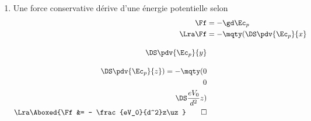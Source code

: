 \documentclass[a4paper, 12pt, final, garamond]{book}
\begin{document}
\begin{enumerate}
\begin{align*}
            \dv{\Ec_m}{t} &= 0
            \\\Lra
            \dv{t}(\Ec_c + \Ec_p) &= 0
            \\\Lra
            \dv{t}(\frac{1}{2}m\zp^2 + \frac{eV_0}{2d^2}z^2) &= 0
            \\\Lra
            m\cancel{\zp}\zpp + \frac{eV_0}{d^2}z\cancel{\zp} &= 0
            \\\Lra
            \Aboxed{\zpp + \w_0{}^2z &= 0}
            \qavec
            \boxed{\w_0 = \sqrt{\frac{eV_0}{md^2}}}
        \end{align*}
        Étant donné que $\w_0 = 2\pi f_0$, on obtient finalement
        \begin{align*}
            \Aboxed{f_0 &= \frac{1}{2\pi}\sqrt{\frac{eV_0}{md^2}}}
            \qed
            \qavec
            \left\{
                \begin{array}{rcl}
                    e   & = & \SI{1.6e-19}{C}\\
                    V_0 & = & \SI{5.0}{V}\\
                    m   & = & \SI{9.1e-31}{kg}\\
                    d   & = & \SI{6.0e-3}{m}
                \end{array}
            \right.\\
            \AN
            \Aboxed{f_0 &= \SI{25}{MHz}}
        \end{align*}
    \item Une force conservative dérive d'une énergie potentielle selon
        \begin{align*}
            \Ff &= -\gd\Ec_p
            \\\Lra
            \Ff &=
            -\mqty(\DS\pdv{\Ec_p}{x}\\[1em]\DS\pdv{\Ec_p}{y}\\[1em]\DS\pdv{\Ec_p}{z})
            =
            -\mqty(0\\0\\\DS\frac{eV_0}{d^2}z)
            \\\Lra
            \Aboxed{\Ff &= - \frac{eV_0}{d^2}z\uz}
            \qed
        \end{align*}
\end{enumerate}
\end{document}
